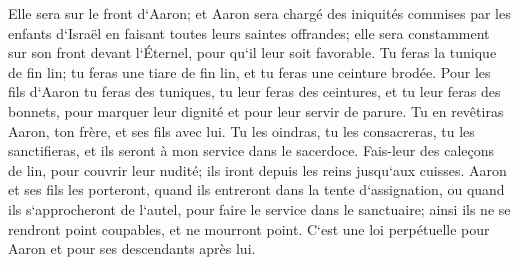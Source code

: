 \verse Elle sera sur le front d`Aaron; et Aaron sera chargé des iniquités commises par les enfants d`Israël en faisant toutes leurs saintes offrandes; elle sera constamment sur son front devant l`Éternel, pour qu`il leur soit favorable. 
\verse Tu feras la tunique de fin lin; tu feras une tiare de fin lin, et tu feras une ceinture brodée. 
\verse Pour les fils d`Aaron tu feras des tuniques, tu leur feras des ceintures, et tu leur feras des bonnets, pour marquer leur dignité et pour leur servir de parure. 
\verse Tu en revêtiras Aaron, ton frère, et ses fils avec lui. Tu les oindras, tu les consacreras, tu les sanctifieras, et ils seront à mon service dans le sacerdoce. 
\verse Fais-leur des caleçons de lin, pour couvrir leur nudité; ils iront depuis les reins jusqu`aux cuisses. 
\verse Aaron et ses fils les porteront, quand ils entreront dans la tente d`assignation, ou quand ils s`approcheront de l`autel, pour faire le service dans le sanctuaire; ainsi ils ne se rendront point coupables, et ne mourront point. C`est une loi perpétuelle pour Aaron et pour ses descendants après lui. 

\chapter{}


